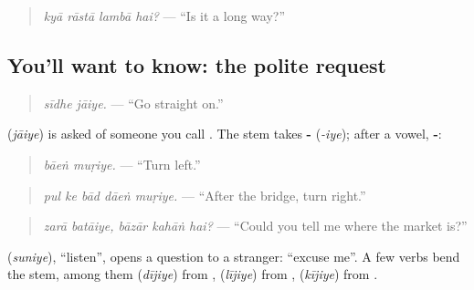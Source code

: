 \begin{quote}
\emph{kyā rāstā lambā hai?} — \textquotedblleft{}Is it a long way?\textquotedblright{}
\end{quote}

\subsection*{You'll want to know: the polite request}
\begin{quote}
\textbf{ }
\end{quote}

\begin{quote}
\emph{sīdhe jāiye.} — \textquotedblleft{}Go straight on.\textquotedblright{}
\end{quote}

\textbf{} (\emph{jāiye}) is \textbf{} asked of someone you call \textbf{}. The stem takes \textbf{-} (\emph{-iye}); after a vowel, \textbf{-}:

\begin{quote}
\textbf{ }
\end{quote}

\begin{quote}
\emph{bāeṅ muṛiye.} — \textquotedblleft{}Turn left.\textquotedblright{}
\end{quote}

\begin{quote}
\textbf{    }
\end{quote}

\begin{quote}
\emph{pul ke bād dāeṅ muṛiye.} — \textquotedblleft{}After the bridge, turn right.\textquotedblright{}
\end{quote}

\begin{quote}
\textbf{    }
\end{quote}

\begin{quote}
\emph{zarā batāiye, bāzār kahāṅ hai?} — \textquotedblleft{}Could you tell me where the market is?\textquotedblright{}
\end{quote}

\textbf{} (\emph{suniye}), \textquotedblleft{}listen\textquotedblright{}, opens a question to a stranger: \textquotedblleft{}excuse me\textquotedblright{}. A few verbs bend the stem, among them \textbf{} (\emph{dījiye}) from \textbf{}, \textbf{} (\emph{lījiye}) from \textbf{}, \textbf{} (\emph{kījiye}) from \textbf{}.

